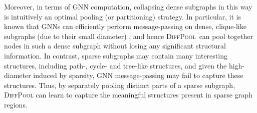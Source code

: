 \documentclass{article}
\newcommand{\name}{\textsc{DiffPool}\xspace}
\newcommand{\cut}[1]{}
\begin{document}
{Moreover, in terms of GNN computation, collapsing dense subgraphs in this way is intuitively an optimal pooling (or partitioning) strategy.
In particular, it is known that GNNs can efficiently perform message-passing on dense, clique-like subgraphs (due to their small diameter) \cite{liao2018graph}, and hence \name\ can pool together nodes in such a dense subgraph without losing any significant structural information.
In contrast, sparse subgraphs may contain many interesting structures, including path-, cycle- and tree-like structures, and given the high-diameter induced by sparsity, GNN message-passing may fail to capture these structures. 
Thus, by separately pooling distinct parts of a sparse subgraph, \name can learn to capture the meaningful structures present 
in sparse graph regions. 
}

\cut{
This interpretation matches our pooling objective well. Intuitively, a clique-like subgraph contains very little interesting structure, and message passing is efficient due to small graph diameter, and hence it could be directly pooled together without losing much structural information in the pooled embedding matrix $Z$. However, a sparse subgraph may contain many interesting structures, including path-, cycle- and tree-like ones. Therefore, message passing may miss these fine-grained structures. Subsequently, each part of the subgraph should be assigned and pooled differently, to capture these meaningful structures. }
\end{document}
